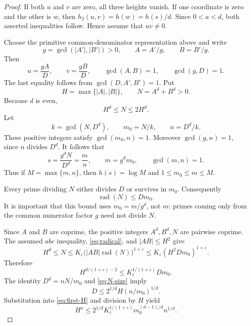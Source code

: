 \documentclass[11pt,a4paper]{article}
\DeclareMathOperator{\rad}{rad}
\begin{document}
\begin{proof}
If both $u$ and $v$ are zero, all three heights vanish.
If one coordinate is zero and the other is $w$, then
$h_2(u,v)=h(w)=h(s)/d$. Since $0<a<d$, both asserted
inequalities follow. Hence assume that $uv\ne0$.

Choose the primitive common-denominator representation above and
write
\[
 g=\gcd(|A'|,|B'|)>0,\qquad A=A'/g,\qquad B=B'/g.
\]
Then
\[
 u=\frac{gA}{D},\qquad v=\frac{gB}{D},\qquad
 \gcd(A,B)=1,\qquad \gcd(g,D)=1.
\]
The last equality follows from $\gcd(D,A',B')=1$.
Put
\[
 H=\max\{|A|,|B|\},\qquad N=A^d+B^d>0.
\]
Because $d$ is even,
\begin{equation}\label{eq:N-size}
                         H^d\le N\le2H^d.
\end{equation}
Let
\[
 k=\gcd(N,D^d),\qquad m_0=N/k,\qquad n=D^d/k.
\]
These positive integers satisfy $\gcd(m_0,n)=1$. Moreover
$\gcd(g,n)=1$, since $n$ divides $D^d$. It follows that
\begin{equation}\label{eq:reduced-output}
         s=\frac{g^dN}{D^d}=\frac{m}{n},\qquad
              m=g^d m_0,\qquad \gcd(m,n)=1.
\end{equation}
Thus if $M=\max\{m,n\}$, then $h(s)=\log M$ and
$1\le m_0\le m\le M$.

Every prime dividing $N$ either divides $D$ or survives in $m_0$.
Consequently
\begin{equation}\label{eq:radical}
                    \rad(N)\le Dm_0.
\end{equation}
It is important that this bound uses $m_0=m/g^d$, not $m$:
primes coming only from the common numerator factor $g$ need
not divide $N$.

Since $A$ and $B$ are coprime, the positive integers
$A^d,B^d,N$ are pairwise coprime. The assumed $abc$ inequality,
\eqref{eq:radical}, and $|AB|\le H^2$ give
\[
 H^d\le N
 \le K_\varepsilon\bigl(|AB|\rad(N)\bigr)^{1+\varepsilon}
 \le K_\varepsilon(H^2Dm_0)^{1+\varepsilon}.
\]
Therefore
\begin{equation}\label{eq:first-H}
 H^{d/(1+\varepsilon)-2}
               \le K_\varepsilon^{1/(1+\varepsilon)}Dm_0.
\end{equation}
The identity $D^d=nN/m_0$ and \eqref{eq:N-size} imply
\[
                    D\le2^{1/d}H(n/m_0)^{1/d}.
\]
Substitution into \eqref{eq:first-H} and division by $H$ yield
\begin{equation}\label{eq:H}
 H^a\le2^{1/d}K_\varepsilon^{1/(1+\varepsilon)}
                          m_0^{(d-1)/d}n^{1/d}.
\end{equation}


\end{proof}
\end{document}
